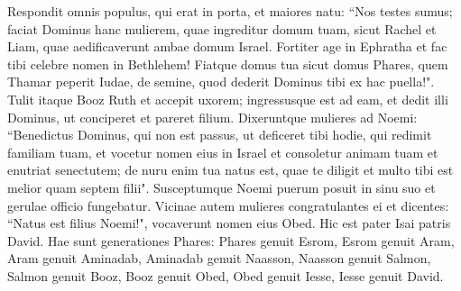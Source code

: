 \begin{biblechapter}
\verse Respondit omnis populus, qui erat in porta, et maiores natu: “Nos testes sumus; faciat Dominus hanc mulierem, quae ingreditur domum tuam, sicut Rachel et Liam, quae aedificaverunt ambae domum Israel. Fortiter age in Ephratha et fac tibi celebre nomen in Bethlehem! 
\verse Fiatque domus tua sicut domus Phares, quem Thamar peperit Iudae, de semine, quod dederit Dominus tibi ex hac puella!". 
\verse Tulit itaque Booz Ruth et accepit uxorem; ingressusque est ad eam, et dedit illi Dominus, ut conciperet et pareret filium. 
\verse Dixeruntque mulieres ad Noemi: “Benedictus Dominus, qui non est passus, ut deficeret tibi hodie, qui redimit familiam tuam, et vocetur nomen eius in Israel 
\verse et consoletur animam tuam et enutriat senectutem; de nuru enim tua natus est, quae te diligit et multo tibi est melior quam septem filii". 
\verse Susceptumque Noemi puerum posuit in sinu suo et gerulae officio fungebatur. 
\verse Vicinae autem mulieres congratulantes ei et dicentes: “Natus est filius Noemi!", vocaverunt nomen eius Obed. Hic est pater Isai patris David. 
\verse Hae sunt generationes Phares: Phares genuit Esrom, 
\verse Esrom genuit Aram, Aram genuit Aminadab, 
\verse Aminadab genuit Naasson, Naasson genuit Salmon,  
\verse Salmon genuit Booz, Booz genuit Obed, 
\verse Obed genuit Iesse, Iesse genuit David.
\end{biblechapter}
